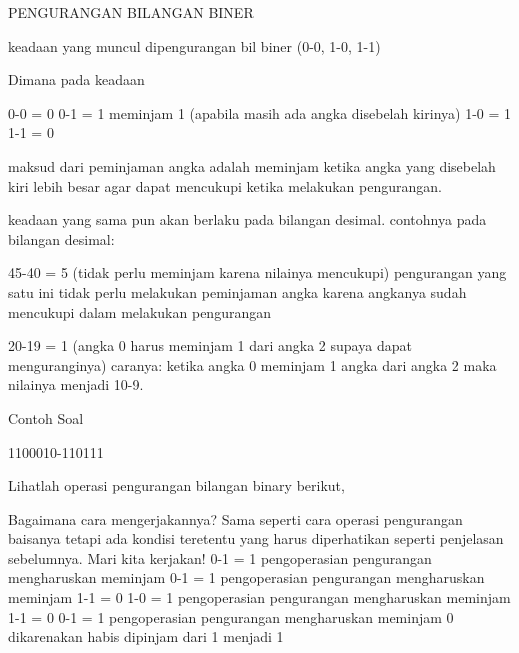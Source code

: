 PENGURANGAN BILANGAN BINER

keadaan yang muncul dipengurangan bil biner
(0-0, 1-0, 1-1)

Dimana pada keadaan

	0-0 = 0
	0-1 = 1 meminjam 1 (apabila masih ada angka disebelah kirinya)
	1-0 = 1
	1-1 = 0
	
maksud dari peminjaman angka adalah meminjam ketika angka yang disebelah kiri lebih besar agar dapat mencukupi ketika melakukan
pengurangan.

keadaan yang sama pun akan berlaku pada bilangan desimal.
contohnya pada bilangan desimal:

	45-40 = 5 (tidak perlu meminjam karena nilainya mencukupi)
				pengurangan yang satu ini tidak perlu melakukan peminjaman angka karena angkanya sudah mencukupi dalam melakukan 
				pengurangan
				
	20-19 = 1 (angka 0 harus meminjam 1 dari angka 2 supaya dapat menguranginya)
				caranya: ketika angka 0 meminjam 1 angka dari angka 2 maka nilainya menjadi 10-9.
				
Contoh Soal

1100010-110111

Lihatlah operasi pengurangan bilangan binary berikut,
 
Bagaimana cara mengerjakannya?
Sama seperti cara operasi pengurangan baisanya tetapi ada kondisi teretentu yang harus diperhatikan seperti penjelasan sebelumnya.
Mari kita kerjakan!
0-1 = 1 pengoperasian pengurangan mengharuskan meminjam
0-1 = 1  pengoperasian pengurangan mengharuskan meminjam
1-1 = 0
1-0 = 1 pengoperasian pengurangan mengharuskan meminjam
1-1 = 0
0-1 = 1 pengoperasian pengurangan mengharuskan meminjam
0 dikarenakan habis dipinjam dari 1 menjadi 1
